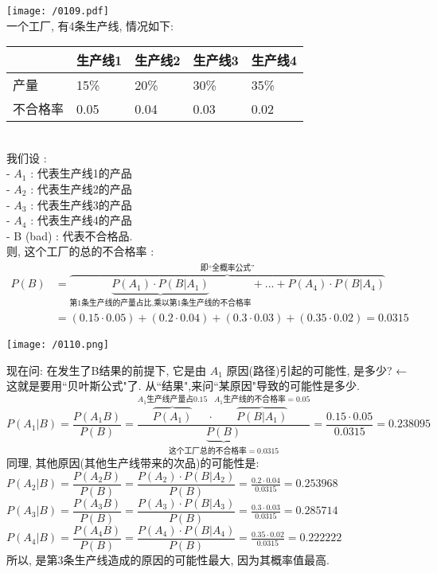 \documentclass[UTF8]{ctexart}
\begin{document}
\begin{myEnvSample}
\texttt{[image: /0109.pdf]} \\

一个工厂, 有4条生产线, 情况如下: \\
	\begin{tabular}{lllll}
		\hline
		& 生产线1 & 生产线2 & 生产线3 & 生产线4 \\
		\hline
		产量   & 15\% & 20\% & 30\% & 35\% \\
		\hline
		不合格率 & 0.05 & 0.04 & 0.03 & 0.02  \\
		\hline
	\end{tabular} \\

我们设 : \\
- $A_1$ : 代表生产线1的产品 \\
- $A_2$ : 代表生产线2的产品 \\
- $A_3$ : 代表生产线3的产品 \\
- $A_4$ : 代表生产线4的产品 \\
- B (bad) : 代表不合格品. \\

则, 这个工厂的总的不合格率 : 
\begin{align*}  %
P(B)
&=\overset{\text{即}\text{全概率公式}}{\overbrace{\underset{\text{第1条生产线的产量占比,乘以第1条生产线的不合格率}}{\underbrace{P(A_1)\cdot P(B|A_1)}}+...+P(A_4)\cdot P(B|A_4)}}\\
&=\left( 0.15\cdot 0.05 \right) +\left( 0.2\cdot 0.04 \right) +\left( 0.3\cdot 0.03 \right) +\left( 0.35\cdot 0.02 \right) =0.0315
\end{align*}

\texttt{[image: /0110.png]}

现在问: 在发生了B结果的前提下, 它是由 $A_1$ 原因(路径)引起的可能性, 是多少? ← 这就是要用``贝叶斯公式"了. 从``结果",来问``某原因"导致的可能性是多少. \\
$
P(A_1|B)=\dfrac{P\left( A_1B \right)}{P\left( B \right)}=\dfrac{\overset{A_1\text{生产线产量占}0.15}{\overbrace{P\left( A_1 \right) }}\cdot \overset{A_1\text{生产线的不合格率}=0.05}{\overbrace{P(B|A_1)}}}{\underset{\text{这个工厂总的不合格率}=0.0315}{\underbrace{P\left( B \right) }}}=\dfrac{0.15\cdot 0.05}{0.0315}=0.238095
$ \\

同理, 其他原因(其他生产线带来的次品)的可能性是: \\
$P(A_2|B)=\dfrac{P\left( A_2B \right)}{P\left( B \right)}=\dfrac{P\left( A_2 \right) \cdot P(B|A_2)}{P\left( B \right)}=\frac{0.2\cdot 0.04}{0.0315}=0.253968$ \\
$P(A_3|B)=\dfrac{P\left( A_3B \right)}{P\left( B \right)}=\dfrac{P\left( A_3 \right) \cdot P(B|A_3)}{P\left( B \right)}=\frac{0.3\cdot 0.03}{0.0315}=0.285714 $ \\
$P(A_4|B)=\dfrac{P\left( A_4B \right)}{P\left( B \right)}=\dfrac{P\left( A_4 \right) \cdot P(B|A_4)}{P\left( B \right)}=\frac{0.35\cdot 0.02}{0.0315}=0.222222 $ \\

所以, 是第3条生产线造成的原因的可能性最大, 因为其概率值最高.
\end{myEnvSample} 
\end{document}
